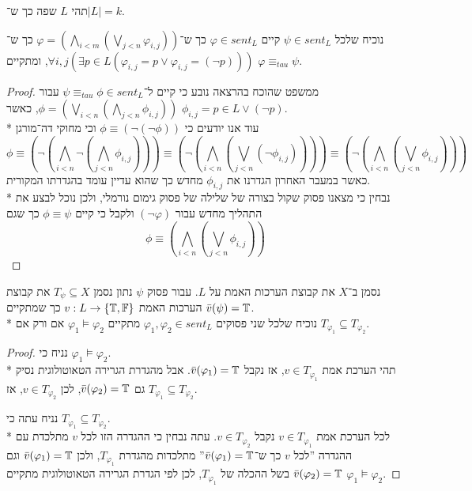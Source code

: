 \Question{}
תהי $L$ שפה כך ש־$|L| = k$.

\Subquestion{}
נוכיח שלכל $\psi \in sent_L$ קיים $\varphi \in sent_L$ כך ש־$\varphi = \left( \bigwedge_{i < m} \left( \bigvee_{j < n} \varphi_{i, j} \right)\right)$
כך ש־$\forall i, j (\exists p \in L (\varphi_{i, j} = p \lor \varphi_{i, j} = (\lnot p)))$,
ומתקיים $\varphi \equiv_{tau} \psi$.
\begin{proof}
	ממשפט שהוכח בהרצאה נובע כי קיים ל־$\psi \equiv_{tau} \phi \in sent_L$ עבור $\phi = \left( \bigvee_{i < n} \left( \bigwedge_{j < n} \phi_{i, j} \right) \right)$,
	כאשר $\phi_{i, j} = p \in L \lor (\lnot p)$. \\*
	עוד אנו יודעים כי $\phi \equiv (\lnot (\lnot \phi))$ וכי מחוקי דה־מורגן
	\[
		\phi
		\equiv \left( \lnot \left( \bigwedge_{i < n} \lnot \left( \bigwedge_{j < n} \phi_{i, j} \right) \right) \right)
		\equiv \left( \lnot \left( \bigwedge_{i < n} \left( \bigvee_{j < n} (\lnot \phi_{i, j}) \right) \right) \right)
		\equiv \left( \lnot \left( \bigwedge_{i < n} \left( \bigvee_{j < n} \phi_{i, j} \right) \right) \right)
	\]
	כאשר במעבר האחרון הגדרנו את $\phi_{i, j}$ מחדש כך שהוא עדיין עומד בהגדרתו המקורית. \\*
	נבחין כי מצאנו פסוק שקול בצורה של שלילה של פסוק גימום נורמלי, ולכן נוכל לבצע את התהליך מחדש עבור $(\lnot \varphi)$ ולקבל כי קיים $\phi \equiv \psi$ כך שגם
	\[
		\phi \equiv \left( \bigwedge_{i < n} \left( \bigvee_{j < n} \phi_{i, j} \right) \right)
	\]
\end{proof}

\Subquestion{}
נסמן ב־$X$ את קבוצת הערכות האמת על $L$. עבור פסוק $\psi$ נתון נסמן $T_\psi \subseteq X$ את קבוצת הערכות האמת $v : L \to \{ \mathbb{T}, \mathbb{F} \}$ כך שמתקיים $\bar{v}(\psi) = \mathbb{T}$. \\*
נוכיח שלכל שני פסוקים $\varphi_1, \varphi_2 \in sent_L$ מתקיים $\varphi_1 \models \varphi_2$ אם ורק אם $T_{\varphi_1} \subseteq T_{\varphi_2}$.
\begin{proof}
	נניח כי $\varphi_1 \models \varphi_2$. \\*
	תהי הערכת אמת $v \in T_{\varphi_1}$, אז נקבל $\bar{v}(\varphi_1) = \mathbb{T}$.
	אבל מהגדרת הגרירה הטאוטולוגית נסיק גם $\bar{v}(\varphi_2) = \mathbb{T}$, לכן $v \in T_{\varphi_2}$, אז $T_{\varphi_1} \subseteq T_{\varphi_2}$.

	נניח עתה כי $T_{\varphi_1} \subseteq T_{\varphi_2}$. \\*
	לכל הערכת אמת $v \in T_{\varphi_1}$ נקבל $v \in T_{\varphi_2}$. עתה נבחין כי ההגדרה הזו לכל $v$ מתלכדת עם ההגדרה ''לכל $v$ כך ש־$\bar{v}(\varphi_1) = \mathbb{T}$'' מתלכדות מהגדרת $T_{\varphi_1}$,
	ולכן $\bar{v}(\varphi_1) = \mathbb{T}$ וגם $\bar{v}(\varphi_2) = \mathbb{T}$ בשל ההכלה של $T_{\varphi_1}$, לכן לפי הגדרת הגרירה הטאוטולוגית מתקיים $\varphi_1 \models \varphi_2$.
\end{proof}

